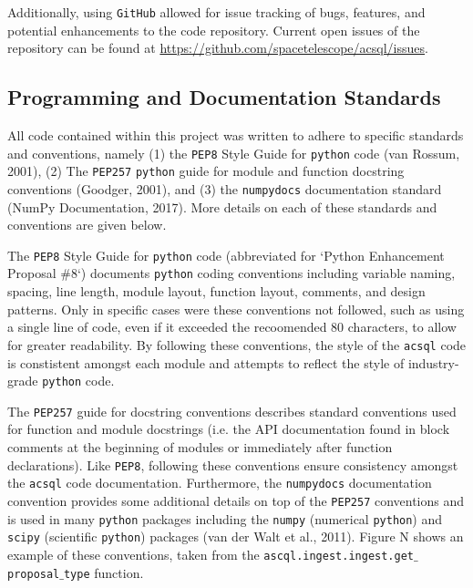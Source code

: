 \documentclass[10pt,journal,compsoc]{IEEEtran}
\begin{document}
Additionally, using \texttt{GitHub} allowed for issue tracking of bugs, features, and
potential enhancements to the code repository.  Current open issues of the repository
can be found at \url{https://github.com/spacetelescope/acsql/issues}.


\subsection{Programming and Documentation Standards}

All code contained within this project was written to adhere to specific standards and
conventions, namely (1) the \texttt{PEP8} Style Guide for \texttt{python} code (van Rossum, 2001),
(2) The \texttt{PEP257} \texttt{python} guide for module and function docstring conventions
(Goodger, 2001), and (3) the \texttt{numpydocs} documentation standard (NumPy Documentation,
2017).  More details on each of these standards and conventions are given below.

The \texttt{PEP8} Style Guide for \texttt{python} code (abbreviated for `Python Enhancement
Proposal \#8`) documents \texttt{python} coding conventions including variable naming,
spacing, line length, module layout, function layout, comments, and design patterns.  Only
in specific cases were these conventions not followed, such as using a single line of code,
even if it exceeded the recoomended 80 characters, to allow for greater readability.  By
following these conventions, the style of the \texttt{acsql} code is constistent amongst
each module and attempts to reflect the style of industry-grade \texttt{python} code.

The \texttt{PEP257} guide for docstring conventions describes standard conventions used
for function and module docstrings (i.e. the API documentation found in block
comments at the beginning of modules or immediately after function declarations).  Like
\texttt{PEP8}, following these conventions ensure consistency amongst the \texttt{acsql}
code documentation.  Furthermore, the \texttt{numpydocs} documentation convention provides
some additional details on top of the \texttt{PEP257} conventions and is used in many
\texttt{python} packages including the \texttt{numpy} (numerical \texttt{python}) and
\texttt{scipy} (scientific \texttt{python}) packages (van der Walt et al., 2011).  Figure N
shows an example of these conventions, taken from the
\texttt{ascql.ingest.ingest.get$\_$proposal$\_$type} function.
\end{document}
